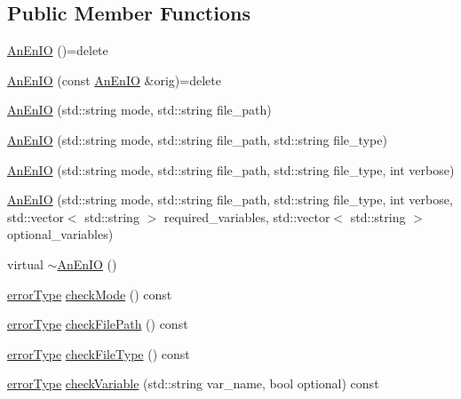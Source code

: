 \subsection*{Public Member Functions}
\begin{DoxyCompactItemize}
\item 
\mbox{\hyperlink{class_an_en_i_o_a199f4cd2569599820126ae27ec25a647}{An\+En\+IO}} ()=delete
\item 
\mbox{\hyperlink{class_an_en_i_o_ab3dc8be2a5d7034cccd35ed72ee41275}{An\+En\+IO}} (const \mbox{\hyperlink{class_an_en_i_o}{An\+En\+IO}} \&orig)=delete
\item 
\mbox{\hyperlink{class_an_en_i_o_ae6c32e309a740b6680e997728b3636a3}{An\+En\+IO}} (std\+::string mode, std\+::string file\+\_\+path)
\item 
\mbox{\hyperlink{class_an_en_i_o_a7556c5e1e44c8d7eeec5dfc93467a91d}{An\+En\+IO}} (std\+::string mode, std\+::string file\+\_\+path, std\+::string file\+\_\+type)
\item 
\mbox{\hyperlink{class_an_en_i_o_a7c97d67357f729e50fc6e0d90fef9e36}{An\+En\+IO}} (std\+::string mode, std\+::string file\+\_\+path, std\+::string file\+\_\+type, int verbose)
\item 
\mbox{\hyperlink{class_an_en_i_o_ac040fa1dad19178f28b719f247e11b0d}{An\+En\+IO}} (std\+::string mode, std\+::string file\+\_\+path, std\+::string file\+\_\+type, int verbose, std\+::vector$<$ std\+::string $>$ required\+\_\+variables, std\+::vector$<$ std\+::string $>$ optional\+\_\+variables)
\item 
virtual \mbox{\hyperlink{class_an_en_i_o_a1e7aef95fd2a0c6aaef55998f48368f4}{$\sim$\+An\+En\+IO}} ()
\item 
\mbox{\hyperlink{class_an_en_i_o_aa56bc1ec6610b86db4349bce20f9ead0}{error\+Type}} \mbox{\hyperlink{class_an_en_i_o_a2dbb61800810628c09158882d3727478}{check\+Mode}} () const
\item 
\mbox{\hyperlink{class_an_en_i_o_aa56bc1ec6610b86db4349bce20f9ead0}{error\+Type}} \mbox{\hyperlink{class_an_en_i_o_aac9e5ef017cb141eedbbda6583b699ad}{check\+File\+Path}} () const
\item 
\mbox{\hyperlink{class_an_en_i_o_aa56bc1ec6610b86db4349bce20f9ead0}{error\+Type}} \mbox{\hyperlink{class_an_en_i_o_aa9b4700db58d0ef09af429d5d31ff55f}{check\+File\+Type}} () const
\item 
\mbox{\hyperlink{class_an_en_i_o_aa56bc1ec6610b86db4349bce20f9ead0}{error\+Type}} \mbox{\hyperlink{class_an_en_i_o_ab7f3ba245b7acb11184e0a5b3490a84b}{check\+Variable}} (std\+::string var\+\_\+name, bool optional) const

\end{DoxyCompactItemize}
